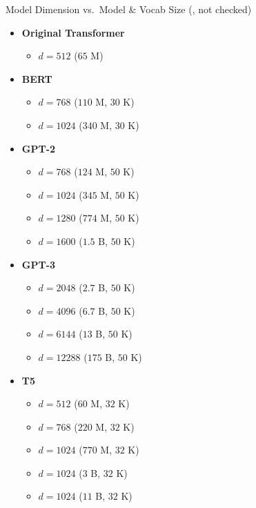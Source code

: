 \begin{slide}[\slideopts,toc={Model Dimension}]{Model Dimension vs.~Model \& Vocab Size
(, not checked)}

\vspace{-2em}


% 

\begin{multicols}{2}
\begin{itemize}
    \item \textbf{Original Transformer}
    \begin{itemize}
      \item $d = 512$ ($65$ M)
    \end{itemize}

    \item \textbf{BERT}
    \begin{itemize}
        \item $d = 768$ ($110$ M, $30$ K)
        \item $d = 1024$ ($340$ M, $30$ K)
    \end{itemize}

    \item \textbf{GPT-2}
    \begin{itemize}
        \item $d = 768$ ($124$ M, $50$ K)
        \item $d = 1024$ ($345$ M, $50$ K)
        \item $d = 1280$ ($774$ M, $50$ K)
        \item $d = 1600$ ($1.5$ B, $50$ K)
    \end{itemize}

    \item \textbf{GPT-3}
    \begin{itemize}
        \item $d = 2048$ ($2.7$ B, $50$ K)
        \item $d = 4096$ ($6.7$ B, $50$ K)
        \item $d = 6144$ ($13$ B, $50$ K)
        \item $d = 12288$ ($175$ B, $50$ K)
    \end{itemize}

    \item \textbf{T5}
    \begin{itemize}
        \item $d = 512$ ($60$ M, $32$ K)
        \item $d = 768$ ($220$ M, $32$ K)
        \item $d = 1024$ ($770$ M, $32$ K)
        \item $d = 1024$ ($3$ B, $32$ K)
        \item $d = 1024$ ($11$ B, $32$ K)
    \end{itemize}


\end{itemize}
\end{multicols}
\end{slide}
